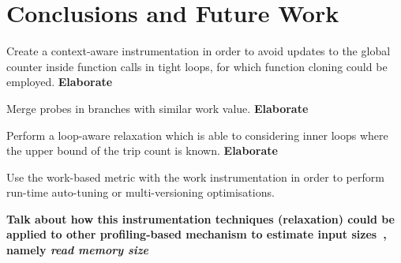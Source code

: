 \chapter{Conclusions and Future Work}



Create a context-aware instrumentation in order to avoid updates to the global counter inside function calls in tight loops, for which function cloning could be employed.
\textbf{Elaborate}

Merge probes in branches with similar work value.
\textbf{Elaborate}

Perform a loop-aware relaxation which is able to considering inner loops where the upper bound of the trip count is known.
\textbf{Elaborate}

Use the work-based metric with the work instrumentation in order to perform run-time auto-tuning or multi-versioning optimisations.


\textbf{Talk about how this instrumentation techniques (relaxation) could be applied to other profiling-based mechanism to estimate input sizes~\citep{zaparanuks12,coppa14}, namely \textit{read memory size}}

